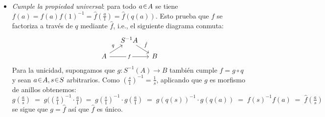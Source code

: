 \begin{sol}
\begin{itemize}
\item\emph{Cumple la propiedad universal}: para todo $a\en A$ se tiene $f(a) = f(a)f(1)^{-1} = \hat{f}(\frac{a}{1}) = \hat{f}(q(a))$. Esto prueba que $f$ se factoriza a través de $q$ mediante $\hat{f}$, i.e., el siguiente diagrama conmuta:
\[\begin{tikzcd}[ampersand replacement=\&,sep = small]
	\& {S^{-1}A} \& \\
	A \&\& B
	\arrow["{\hat{f}}", from=1-2, to=2-3]
	\arrow["q", from=2-1, to=1-2]
	\arrow["f"{description}, from=2-1, to=2-3]
\end{tikzcd}\]
Para la unicidad, supongamos que $g\colon S^{-1}(A) \to B$ también cumple $f = g \circ q$ y sean $a\en A, s\en S$ arbitrarios. Como $(\frac{s}{1})^{-1} = \frac{1}{s}$, aplicando que $g$ es morfismo de anillos obtenemos:
\[
g(\tfrac{a}{s})
\;=\; g\bigl( (\tfrac{s}{1})^{-1} \cdot \tfrac{a}{1} \bigr)
\;=\; g(\tfrac{s}{1})^{-1} \cdot g(\tfrac{a}{1})
\;=\; g(q(s))^{-1} \cdot g(q(a)) 
\;=\; f(s)^{-1}f(a)
\;=\; \hat{f}(\tfrac{a}{s})
\]
se sigue que $g=\hat{f}$ así que $\hat{f}$ es único.
\end{itemize}
\end{sol}